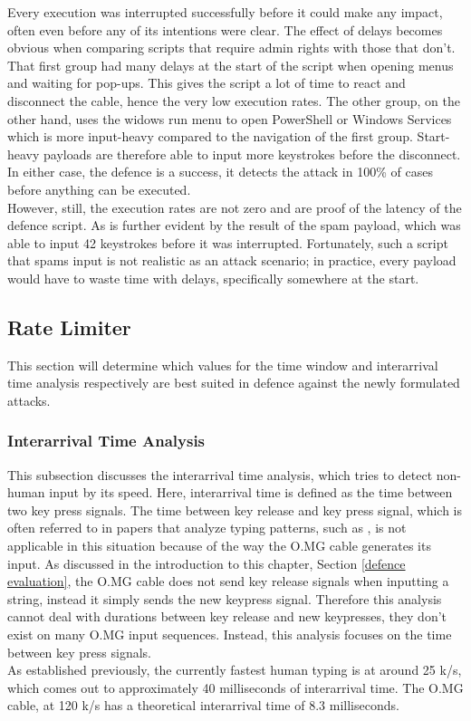 Every execution was interrupted successfully before it could make any impact, often even before any of its intentions were clear. The effect of delays becomes obvious when comparing scripts that require admin rights with those that don't. That first group had many delays at the start of the script when opening menus and waiting for pop-ups. This gives the script a lot of time to react and disconnect the cable, hence the very low execution rates. The other group, on the other hand, uses the widows run menu to open PowerShell or Windows Services which is more input-heavy compared to the navigation of the first group. Start-heavy payloads are therefore able to input more keystrokes before the disconnect. In either case, the defence is a success, it detects the attack in 100\% of cases before anything can be executed. \\
However, still, the execution rates are not zero and are proof of the latency of the defence script. As is further evident by the result of the spam payload, which was able to input 42 keystrokes before it was interrupted.  Fortunately, such a script that spams input is not realistic as an attack scenario; in practice, every payload would have to waste time with delays, specifically somewhere at the start. 


\subsection{Rate Limiter}

This section will determine which values for the time window and interarrival time analysis respectively are best suited in defence against the newly formulated attacks.\\


\subsubsection{Interarrival Time Analysis}


This subsection discusses the interarrival time analysis, which tries to detect non-human input by its speed. Here, interarrival time is defined as the time between two key press signals. The time between key release and key press signal, which is often referred to in papers that analyze typing patterns, such as \cite{neunerUSBlockBlockingUSBBased2018}, is not applicable in this situation because of the way the O.MG cable generates its input. As discussed in the introduction to this chapter, Section \ref{defence evaluation}, the O.MG cable does not send key release signals when inputting a string, instead it simply sends the new keypress signal. Therefore this analysis cannot deal with durations between key release and new keypresses, they don't exist on many O.MG input sequences. Instead, this analysis focuses on the time between key press signals. \\
As established previously, the currently fastest human typing is at around 25 k/s, which comes out to approximately 40 milliseconds of interarrival time. The O.MG cable, at 120 k/s has a theoretical interarrival time of 8.3 milliseconds. 

